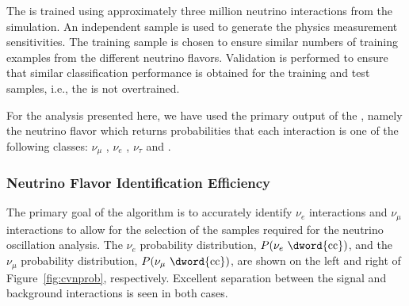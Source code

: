 The  is trained using approximately three million neutrino interactions from the  simulation. An independent sample is used to generate the physics measurement sensitivities. The training sample is chosen to ensure similar numbers of training examples from the different neutrino flavors. Validation is performed to ensure that similar classification performance is obtained for the training and test samples, i.e., the  is not overtrained.



For the analysis presented here, we have used the primary output of the , namely the neutrino flavor which returns probabilities that each interaction is one of the following classes: $\nu_{\mu}$ , $\nu_{e}$ , $\nu_{\tau}$  and . 

\subsubsection{Neutrino Flavor Identification Efficiency}
The primary goal of the  algorithm is to accurately identify $\nu_{e}$  interactions and $\nu_{\mu}$  interactions to allow for the selection of the samples required for the neutrino oscillation analysis. The $\nu_{e}$  probability distribution, $P(\nu_e \textrm{ \dword{cc}})$, and the $\nu_\mu$  probability distribution, $P(\nu_\mu \textrm{ \dword{cc}})$, are shown on the left and right of Figure~\ref{fig:cvnprob}, respectively. Excellent separation between the signal and background interactions is seen in both cases.

